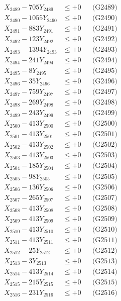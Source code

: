 \documentclass[a4paper,10pt]{article}
\begin{document}
{\begin{align}
X_{2489} - 705Y_{2489} &\leq +0 && \text{(G2489)} \\
X_{2490} - 1055Y_{2490} &\leq +0 && \text{(G2490)} \\
\allowbreak
X_{2491} - 883Y_{2491} &\leq +0 && \text{(G2491)} \\
X_{2492} - 123Y_{2492} &\leq +0 && \text{(G2492)} \\
X_{2493} - 1394Y_{2493} &\leq +0 && \text{(G2493)} \\
X_{2494} - 241Y_{2494} &\leq +0 && \text{(G2494)} \\
X_{2495} - 8Y_{2495} &\leq +0 && \text{(G2495)} \\
X_{2496} - 35Y_{2496} &\leq +0 && \text{(G2496)} \\
X_{2497} - 759Y_{2497} &\leq +0 && \text{(G2497)} \\
X_{2498} - 269Y_{2498} &\leq +0 && \text{(G2498)} \\
X_{2499} - 243Y_{2499} &\leq +0 && \text{(G2499)} \\
X_{2500} - 413Y_{2500} &\leq +0 && \text{(G2500)} \\
\allowbreak
X_{2501} - 413Y_{2501} &\leq +0 && \text{(G2501)} \\
X_{2502} - 413Y_{2502} &\leq +0 && \text{(G2502)} \\
X_{2503} - 413Y_{2503} &\leq +0 && \text{(G2503)} \\
X_{2504} - 185Y_{2504} &\leq +0 && \text{(G2504)} \\
X_{2505} - 98Y_{2505} &\leq +0 && \text{(G2505)} \\
X_{2506} - 136Y_{2506} &\leq +0 && \text{(G2506)} \\
X_{2507} - 265Y_{2507} &\leq +0 && \text{(G2507)} \\
X_{2508} - 413Y_{2508} &\leq +0 && \text{(G2508)} \\
X_{2509} - 413Y_{2509} &\leq +0 && \text{(G2509)} \\
X_{2510} - 413Y_{2510} &\leq +0 && \text{(G2510)} \\
\allowbreak
X_{2511} - 413Y_{2511} &\leq +0 && \text{(G2511)} \\
X_{2512} - 25Y_{2512} &\leq +0 && \text{(G2512)} \\
X_{2513} - 3Y_{2513} &\leq +0 && \text{(G2513)} \\
X_{2514} - 413Y_{2514} &\leq +0 && \text{(G2514)} \\
X_{2515} - 215Y_{2515} &\leq +0 && \text{(G2515)} \\
X_{2516} - 231Y_{2516} &\leq +0 && \text{(G2516)} \\

\end{align}}
\end{document}
